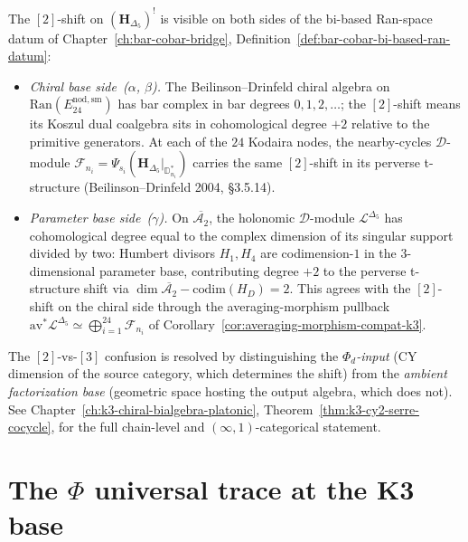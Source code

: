 \begin{remark}
\label{rem:phi-shift-bi-based-bridge}
The $[2]$-shift on $(\mathbf{H}_{\Delta_5})^!$ is visible on both sides of the bi-based Ran-space datum of Chapter~\ref{ch:bar-cobar-bridge}, Definition~\ref{def:bar-cobar-bi-based-ran-datum}:
\begin{itemize}
\item \emph{Chiral base side~($\alpha$, $\beta$).} The Beilinson--Drinfeld chiral algebra on $\mathrm{Ran}(E^{\mathrm{nod,sm}}_{24})$ has bar complex in bar degrees $0,1,2,\ldots$; the $[2]$-shift means its Koszul dual coalgebra sits in cohomological degree $+2$ relative to the primitive generators. At each of the $24$ Kodaira nodes, the nearby-cycles $\mathcal{D}$-module $\mathcal{F}_{n_i}=\Psi_{s_i}(\mathbf{H}_{\Delta_5}|_{\mathbb{D}^*_{n_i}})$ carries the same $[2]$-shift in its perverse t-structure (Beilinson--Drinfeld 2004, \S3.5.14).
\item \emph{Parameter base side~($\gamma$).} On $\overline{\mathcal{A}_2}$, the holonomic $\mathcal{D}$-module $\mathcal{L}^{\Delta_5}$ has cohomological degree equal to the complex dimension of its singular support divided by two: Humbert divisors $H_1, H_4$ are codimension-$1$ in the $3$-dimensional parameter base, contributing degree $+2$ to the perverse t-structure shift via $\dim\overline{\mathcal{A}_2} - \mathrm{codim}(H_D) = 2$. This agrees with the $[2]$-shift on the chiral side through the averaging-morphism pullback $\mathrm{av}^*\mathcal{L}^{\Delta_5}\simeq\bigoplus_{i=1}^{24}\mathcal{F}_{n_i}$ of Corollary~\ref{cor:averaging-morphism-compat-k3}.
\end{itemize}
The $[2]$-vs-$[3]$ confusion is resolved by distinguishing the \emph{$\Phi_d$-input} (CY dimension of the source category, which determines the shift) from the \emph{ambient factorization base} (geometric space hosting the output algebra, which does not). See Chapter~\ref{ch:k3-chiral-bialgebra-platonic}, Theorem~\ref{thm:k3-cy2-serre-cocycle}, for the full chain-level and $(\infty,1)$-categorical statement.
\end{remark}

\section{The \texorpdfstring{$\Phi$}{Phi} universal trace at the K3 base}
\label{sec:phiutp-k3-base}

